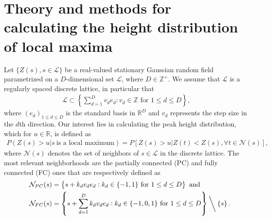 \documentclass{article}
\begin{document}

\section{Theory and methods for calculating the height distribution of local maxima}
\label{sec2}
Let $\{Z(s), s\in \mathcal{L}\}$ be a real-valued stationary Gaussian random field parametrized on a $D$-dimensional set $\mathcal{L}$, where $D \in \mathbb{Z}^{+}$. We assume that $\mathcal{L}$ is a regularly spaced discrete lattice, in particular that 
\begin{align*}
    \mathcal{L} \subset \left\{\sum_{d=1}^D v_de_d: v_d \in \mathbb{Z} \text{ for } 1 \leq d \leq D\right\},
\end{align*}
where $(e_d)_{1 \leq d \leq D}$ is the standard basis in $\mathbb{R}^D$ and $v_d$ represents the step size in the $d$th direction. Our interest lies in calculating the peak height distribution, which for $u \in \mathbb{R}$, is defined as
\begin{align}
P( Z(s) > u | s\ \text{is a local maximum}) = P[Z(s)>u|Z(t) < Z(s), \forall t \in \mathcal{N}(s)], \label{eqn2.2}
\end{align}
where $\mathcal{N}(s)$ denotes the set of neighbors of $s\in \mathcal{L}$ in the discrete lattice. The most relevant neighborhoods are the partially connected (PC) and fully connected (FC) ones that are respectively defined as 
\begin{align}
    \quad\mathcal{N}_{PC}(s) &= \left\lbrace s + k_d v_d e_d: k_d \in \lbrace -1,1\rbrace \text{ for } 1 \leq d \leq D\right\rbrace \text{ and }\label{partial}\\ 
    \quad\mathcal{N}_{FC}(s) &= \left\lbrace s +  \sum_{d=1}^D k_d v_d e_d: k_d \in \lbrace -1,0,1\rbrace \text{ for } 1 \leq d \leq D \right\rbrace \mathbin{\bigg\backslash} \left\{s\right\}. \label{connectivity}
\end{align}
\end{document}
